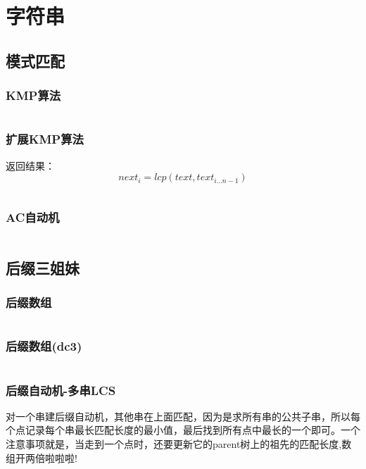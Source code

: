 \documentclass[a4paper]{article}
\newcommand{\cppcode}[1]{
    \inputminted[mathescape,
    frame=lines,linenos]{cpp}{source/#1}
}
\begin{document}
\section{字符串}

\subsection{模式匹配}

\subsubsection{KMP算法}

\cppcode{string-manipulation/KMP.cpp}

\subsubsection{扩展KMP算法}

返回结果：$$next_i = lcp(text, text_{i \dots n-1})$$

\cppcode{string-manipulation/ExtKMP.cpp}

\subsubsection{AC自动机}

\cppcode{string-manipulation/ACmachine.cpp}

\subsection{后缀三姐妹}

\subsubsection{后缀数组}

\cppcode{string-manipulation/Sa.cpp}

\subsubsection{后缀数组(dc3)}
\cppcode{string-manipulation/DC3.cpp}

\subsubsection{后缀自动机-多串LCS}
\indent 对一个串建后缀自动机，其他串在上面匹配，因为是求所有串的公共子串，所以每个点记录每个串最长匹配长度的最小值，最后找到所有点中最长的一个即可。一个注意事项就是，当走到一个点时，还要更新它的parent树上的祖先的匹配长度,数组开两倍啦啦啦!
\cppcode{string-manipulation/Sam-LCS.cpp}
\end{document}
